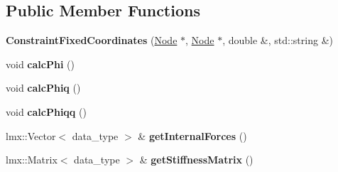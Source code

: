 \subsection*{Public Member Functions}
\begin{CompactItemize}
\item 
\hypertarget{classmknix_1_1ConstraintFixedCoordinates_0e45a40d38156a55c34380238d369592}{
\textbf{ConstraintFixedCoordinates} (\hyperlink{classmknix_1_1Node}{Node} $\ast$, \hyperlink{classmknix_1_1Node}{Node} $\ast$, double \&, std::string \&)}
\label{classmknix_1_1ConstraintFixedCoordinates_0e45a40d38156a55c34380238d369592}

\item 
\hypertarget{classmknix_1_1ConstraintFixedCoordinates_e549d41c12fcc094bdc32bc853ebbd84}{
void \textbf{calcPhi} ()}
\label{classmknix_1_1ConstraintFixedCoordinates_e549d41c12fcc094bdc32bc853ebbd84}

\item 
\hypertarget{classmknix_1_1ConstraintFixedCoordinates_250813aed17ab80b03a9b6b7f4a7ce8b}{
void \textbf{calcPhiq} ()}
\label{classmknix_1_1ConstraintFixedCoordinates_250813aed17ab80b03a9b6b7f4a7ce8b}

\item 
\hypertarget{classmknix_1_1ConstraintFixedCoordinates_80e20da8642dc3c35b7969f7c2c5affe}{
void \textbf{calcPhiqq} ()}
\label{classmknix_1_1ConstraintFixedCoordinates_80e20da8642dc3c35b7969f7c2c5affe}

\item 
\hypertarget{classmknix_1_1ConstraintFixedCoordinates_24c5ba96ad8fcdba23d6fbeda1e87583}{
lmx::Vector$<$ data\_\-type $>$ \& \textbf{getInternalForces} ()}
\label{classmknix_1_1ConstraintFixedCoordinates_24c5ba96ad8fcdba23d6fbeda1e87583}

\item 
\hypertarget{classmknix_1_1ConstraintFixedCoordinates_df956a7d7e5d17b05729fc5532ad840c}{
lmx::Matrix$<$ data\_\-type $>$ \& \textbf{getStiffnessMatrix} ()}
\label{classmknix_1_1ConstraintFixedCoordinates_df956a7d7e5d17b05729fc5532ad840c}

\end{CompactItemize}
